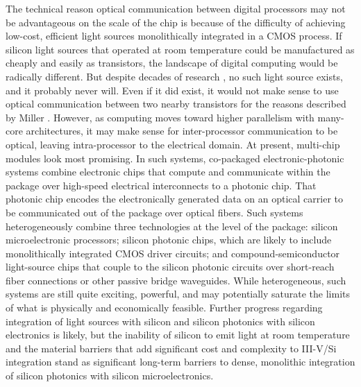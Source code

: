 The technical reason optical communication between digital processors may not be advantageous on the scale of the chip is because of the difficulty of achieving low-cost, efficient light sources monolithically integrated in a CMOS process. If silicon light sources that operated at room temperature could be manufactured as cheaply and easily as transistors, the landscape of digital computing would be radically different. But despite decades of research \cite{shxu2007}, no such light source exists, and it probably never will. Even if it did exist, it would not make sense to use optical communication between two nearby transistors for the reasons described by Miller \cite{mi2017}. However, as computing moves toward higher parallelism with many-core architectures, it may make sense for inter-processor communication to be optical, leaving intra-processor to the electrical domain. At present, multi-chip modules look most promising. In such systems, co-packaged electronic-photonic systems combine electronic chips that compute and communicate within the package over high-speed electrical interconnects to a photonic chip. That photonic chip encodes the electronically generated data on an optical carrier to be communicated out of the package over optical fibers. Such systems heterogeneously combine three technologies at the level of the package: silicon microelectronic processors; silicon photonic chips, which are likely to include monolithically integrated CMOS driver circuits; and compound-semiconductor light-source chips that couple to the silicon photonic circuits over short-reach fiber connections or other passive bridge waveguides. While heterogeneous, such systems are still quite exciting, powerful, and may potentially saturate the limits of what is physically and economically feasible. Further progress regarding integration of light sources with silicon and silicon photonics with silicon electronics is likely, but the inability of silicon to emit light at room temperature and the material barriers that add significant cost and complexity to III-V/Si integration stand as significant long-term barriers to dense, monolithic integration of silicon photonics with silicon microelectronics.

